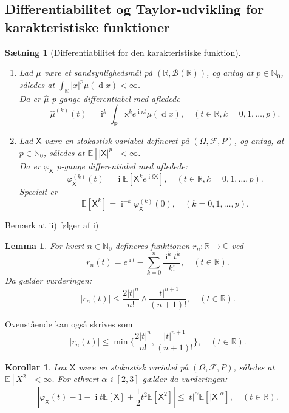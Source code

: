 \documentclass{article}
\newcommand{\N}{\mathbb{N}}
\newcommand{\R}{\mathbb{R}}
\newcommand{\C}{\mathbb{C}}
\newcommand{\E}{\mathbb{E}}
\newcommand{\1}{\mathbbm{1}}
\newcommand{\X}{\mathsf{X}}
\newcommand{\B}{\mathcal{B}}
\newcommand{\deriv}{\operatorname{d}}
\newcommand{\icomp}{\operatorname{i}}
\newcommand{\varx}{\varphi_\X}
\newcommand{\pfield}{(\Omega, \mathcal{F}, P)}
\theoremstyle{boxed}
\newtheorem{lemma}[theorem]{Lemma}
\newtheorem{corollary}[theorem]{Korollar}
\newtheorem{proposition}[theorem]{Sætning}
\begin{document}
\subsection{Differentiabilitet og Taylor-udvikling for karakteristiske funktioner}
\begin{theorem-box}
    \begin{proposition}[Differentiabilitet for den karakteristiske funktion]
        \begin{enumerate}
            \item[\textnormal{(i)}] Lad $\mu$ være et sandsynlighedsmål på $(\R, \B(\R))$, og antag at $p\in\N_0$, således at $\int_\R|x|^p\mu(\deriv x)<\infty$.
            \\Da er $\hat{\mu}$ p-gange differentiabel med afledede
            $$\hat{\mu}^{(k)}(t)=\icomp^k\int_{\R}\mathsf{x}^ke^{\icomp\mathsf{x}t}\mu(\deriv x), \quad (t\in\R, k=0,1,\dots, p).$$
            \item[\textnormal{(ii)}] Lad $\X$ være en stokastisk variabel defineret på $\pfield$, og antag, at $p\in\N_0$, således at $\E[|\X|^p]<\infty$.
            \\Da er $\varx$ p-gange differentiabel med afledede:
            $$\varx^{(k)}(t)=\icomp\E[\X^ke^{\icomp t\X}], \quad (t\in\R, k=0,1,\dots, p).$$ 
            Specielt er 
            $$\E[\X^k]=\icomp^{-k}\varx^{(k)}(0), \quad (k=0,1,\dots, p).$$
        \end{enumerate}
    \end{proposition}
\end{theorem-box}
Bemærk at ii) følger af i)
\begin{theorem-box}
    \begin{lemma}
        For hvert $n\in\N_0$ defineres funktionen $r_n:\R\rightarrow \C$ ved $$r_n(t)=e^{\icomp t}-\sum_{k=0}^n\frac{\icomp^k t^k}{k!}, \quad (t\in\R).$$
        Da gælder vurderingen:
        $$|r_n(t)|\leq \frac{2|t|^n}{n!}\wedge \frac{|t|^{n+1}}{(n+1)!},\quad  (t\in\R).$$
    \end{lemma}
\end{theorem-box}
Ovenstående kan også skrives som 
$$|r_n(t)|\leq \min\{\frac{2|t|^n}{n!},\frac{|t|^{n+1}}{(n+1)!}\},\quad  (t\in\R).$$
\begin{theorem-box}
    \begin{corollary}
        Lax $\X$ være en stokastisk variabel på $\pfield$, således at $\E[X^2]<\infty$. For ethvert $\alpha$ i $[2,3]$ gælder da vurderingen:
        $$\left|\varx(t)-1-\icomp t\E[\X]+\frac{1}{2}t^2\E[\X^2]\right|\leq |t|^\alpha\E[|\X|^\alpha], \quad (t\in\R).$$
    \end{corollary}
\end{theorem-box}
\end{document}
